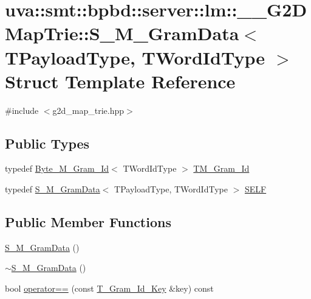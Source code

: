 \hypertarget{structuva_1_1smt_1_1bpbd_1_1server_1_1lm_1_1_____g2_d_map_trie_1_1_s___m___gram_data}{}\section{uva\+:\+:smt\+:\+:bpbd\+:\+:server\+:\+:lm\+:\+:\+\_\+\+\_\+\+G2\+D\+Map\+Trie\+:\+:S\+\_\+\+M\+\_\+\+Gram\+Data$<$ T\+Payload\+Type, T\+Word\+Id\+Type $>$ Struct Template Reference}
\label{structuva_1_1smt_1_1bpbd_1_1server_1_1lm_1_1_____g2_d_map_trie_1_1_s___m___gram_data}


{\ttfamily \#include $<$g2d\+\_\+map\+\_\+trie.\+hpp$>$}

\subsection*{Public Types}
\begin{DoxyCompactItemize}
\item 
typedef \hyperlink{classuva_1_1smt_1_1bpbd_1_1server_1_1lm_1_1m__grams_1_1m__gram__id_1_1_byte___m___gram___id}{Byte\+\_\+\+M\+\_\+\+Gram\+\_\+\+Id}$<$ T\+Word\+Id\+Type $>$ \hyperlink{structuva_1_1smt_1_1bpbd_1_1server_1_1lm_1_1_____g2_d_map_trie_1_1_s___m___gram_data_aadcea57ebc508f6acf9ec6764e991c13}{T\+M\+\_\+\+Gram\+\_\+\+Id}
\item 
typedef \hyperlink{structuva_1_1smt_1_1bpbd_1_1server_1_1lm_1_1_____g2_d_map_trie_1_1_s___m___gram_data}{S\+\_\+\+M\+\_\+\+Gram\+Data}$<$ T\+Payload\+Type, T\+Word\+Id\+Type $>$ \hyperlink{structuva_1_1smt_1_1bpbd_1_1server_1_1lm_1_1_____g2_d_map_trie_1_1_s___m___gram_data_a88a54f22f9c347843a007f3617bf34dc}{S\+E\+L\+F}
\end{DoxyCompactItemize}
\subsection*{Public Member Functions}
\begin{DoxyCompactItemize}
\item 
\hyperlink{structuva_1_1smt_1_1bpbd_1_1server_1_1lm_1_1_____g2_d_map_trie_1_1_s___m___gram_data_a05967429ad5f775dec67bd6f17431e57}{S\+\_\+\+M\+\_\+\+Gram\+Data} ()
\item 
\hyperlink{structuva_1_1smt_1_1bpbd_1_1server_1_1lm_1_1_____g2_d_map_trie_1_1_s___m___gram_data_abb29d78cb4ff7ee9fed1f699aa2bced2}{$\sim$\+S\+\_\+\+M\+\_\+\+Gram\+Data} ()
\item 
bool \hyperlink{structuva_1_1smt_1_1bpbd_1_1server_1_1lm_1_1_____g2_d_map_trie_1_1_s___m___gram_data_a0c4db8199cfc6e6bc984fe0082ba92f7}{operator==} (const \hyperlink{structuva_1_1smt_1_1bpbd_1_1server_1_1lm_1_1m__grams_1_1m__gram__id_1_1_t___gram___id___key}{T\+\_\+\+Gram\+\_\+\+Id\+\_\+\+Key} \&key) const 
\end{DoxyCompactItemize}
